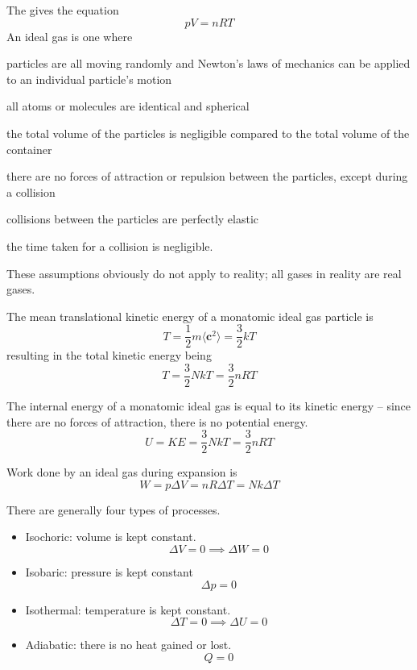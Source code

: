 \documentclass[Physics.tex]{subfiles}
\begin{document}
The  gives the equation \begin{equation}pV = nRT\end{equation} An ideal gas is one where \begin{slinenum}
\item particles are all moving randomly and Newton's laws of mechanics can be applied to an individual particle's motion
\item all atoms or molecules are identical and spherical
\item the total volume of the particles is negligible compared to the total volume of the container
\item there are no forces of attraction or repulsion between the particles, except during a collision
\item collisions between the particles are perfectly elastic
\item the time taken for a collision is negligible.
\end{slinenum} These assumptions obviously do not apply to reality; all gases in reality are real gases.

The mean translational kinetic energy of a monatomic ideal gas particle is \begin{equation}T = \frac{1}{2}m\langle\mathbf{c}^2\rangle = \frac{3}{2}kT\end{equation} resulting in the total kinetic energy being \begin{equation}T = \frac{3}{2}NkT = \frac{3}{2}nRT\end{equation}

The internal energy of a monatomic ideal gas is equal to its kinetic energy -- since there are no forces of attraction, there is no potential energy. \begin{equation}U = KE = \frac{3}{2}NkT = \frac{3}{2}nRT\end{equation}

Work done by an ideal gas during expansion is \begin{equation}W = p\Delta V = nR\Delta T = Nk\Delta T\end{equation}

There are generally four types of processes.
\begin{itemize}
\item Isochoric: volume is kept constant. \[\Delta V = 0 \implies \Delta W = 0\]
\item Isobaric: pressure is kept constant \[\Delta p = 0\]
\item Isothermal: temperature is kept constant. \[\Delta T = 0 \implies \Delta U = 0\]
\item Adiabatic: there is no heat gained or lost. \[Q = 0\]
\end{itemize}
\end{document}
